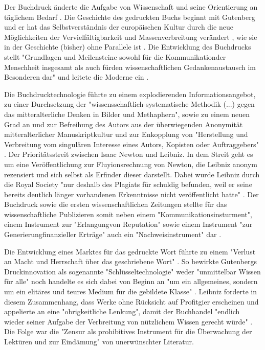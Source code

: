 Der Buchdruck änderte die Aufgabe von Wissenschaft und seine Orientierung an täglichem Bedarf \cite{Luhmann1998}. Die Geschichte des gedruckten Buchs beginnt mit Gutenberg \cite{wittmann_1999_geschichte} und er hat das Selbstverständnis der europäischen Kultur durch die neue Möglichkeiten der Vervielfältigbarkeit und Massenverbreitung verändert \cite{wunderlich_2008_buchdruck}, wie sie in der Geschichte (bisher) ohne Parallele ist \cite{giesecke_1991_buchdruck}. Die Entwicklung des Buchdrucks stellt "Grundlagen und Meilensteine sowohl für die Kommunikationder Menschheit insgesamt als auch fürden wissenschaftlichen Gedankenaustausch im Besonderen dar" \cite{schirmbacher_2009_wisspub} und leitete die Moderne ein \cite{luhmann_1997_gesellschaft}. 

Die Buchdrucktechnologie führte zu einem explodierenden Informationsangebot, zu einer Durchsetzung der "wissensschaftlich-systematische Methodik (...) gegen das mitteralterliche Denken in Bilder und Methaphern", sowie zu einem neuen Grad an und zur Befreihung des Autors aus der überwiegenden Anonymität mitteralterlicher Manuskriptkultur und zur Enkopplung von "Herstellung und Verbreitung vom singulären Interesse eines Autors, Kopisten oder Auftraggebers"\cite{wunderlich_2008_buchdruck} \cite{schirmbacher_2009_wisspub}. Der Prioritätsstreit zwischen Isaac Newton und Leibniz. In dem Streit geht es um eine Veröffentlichung zur Fluyionsrechnung von Newton, die Leibniz anonym rezensiert und sich selbst als Erfinder dieser darstellt.\cite{2013_leibniz} Dabei wurde Leibniz durch die Royal Society "nur deshalb des Plagiats für schuldig befunden, weil er seine bereits deutlich länger vorhandenen Erkenntnisse nicht veröffentlicht hatte" \cite{schirmbacher_2009_wisspub}. Der Buchdruck sowie die ersten wissenschaftlichen Zeitungen stellte für das wissenschaftliche Publizieren somit neben einem "Kommunikationsinsturment", einem Instrument zur "Erlangungvon Reputation" sowie einem Instrument "zur Generierungfinanzieller Erträge" auch ein "Nachweisinstrument" dar \cite{wunderlich_2008_buchdruck} \cite{schirmbacher_2009_wisspub}. 

Die Entwicklung eines Marktes für das gedruckte Wort führte zu einem "Verlust an Macht und Herrschaft über das geschriebene Wort" \cite{wunderlich_2008_buchdruck}. So bewirkte Gutenbergs Druckinnovation als sogenannte "Schlüsseltechnologie"\cite{jager_1993_theoretische} weder "unmittelbar Wissen für alle" noch handelte es sich dabei von Beginn an "um ein allgemeines, sondern um ein elitäres und teures Medium für die gebildete Klasse" \cite{hartmann_2008_medien}. Leibniz forderte in diesem Zusammenhang, dass Werke ohne Rücksicht auf Profitgier erscheinen und appelierte an eine "obrigkeitliche Lenkung", damit der Buchhandel "endlich wieder seiner Aufgabe der Verbreitung von nützlichem Wissen gerecht würde" \cite{wittmann_1999_geschichte}. Die Folge war die "Zensur als prohibitives Instrument für die Überwachung der Lektüren und zur Eindämung" von unerwünschter Literatur.

